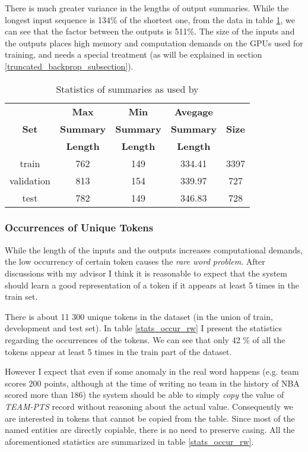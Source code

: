 There is much greater variance in the lengths of output summaries. While the longest input sequence is 134\% of the shortest one, from the data in table \ref{stats_sums_orig_rw}, we can see that the factor between the outputs is 511\%. The size of the inputs and the outputs places high memory and computation demands on the GPUs used for training, and needs a special treatment (as will be explained in section \ref{truncated_backprop_subsection}).

\begin{table}[h!]
    \centering
    \begin{tabular}{ccccc}
        \toprule
        {}    & \textbf{Max} & \textbf{Min} & \textbf{Avegage}& {} \\
        \textbf{Set} & \textbf{Summary} & \textbf{Summary} & \textbf{Summary} & \textbf{Size} \\
        {} & \textbf{Length} & \textbf{Length} & \textbf{Length} & {} \\
        \midrule
        train      & 762 & 149 & 334.41 & 3397  \\
        validation & 813 & 154 & 339.97 & 727 \\
        test       & 782 & 149 & 346.83 & 728
    \end{tabular}
    \caption{Statistics of summaries as used by \citep{wiseman2017}} \label{stats_sums_orig_rw}
\end{table}


\subsubsection{Occurrences of Unique Tokens}

While the length of the inputs and the outputs increases computational demands, the low occurrency of certain token causes the \emph{rare word problem}. After discussions with my advisor I think it is reasonable to expect that the system should learn a good representation of a token if it appears at least 5 times in the train set.

There is about 11 300 unique tokens in the dataset (in the union of train, development and test set). In table \ref{stats_occur_rw} I present the statistics regarding the occurrences of the tokens. We can see that only 42 \% of all the tokens appear at least 5 times in the train part of the dataset.

However I expect that even if some anomaly in the real word happens (e.g. team scores 200 points, although at the time of writing no team in the history of NBA scored more than 186) the system should be able to simply \emph{copy} the value of \emph{TEAM-PTS} record without reasoning about the actual value. Consequently we are interested in tokens that cannot be copied from the table. Since most of the named entities are directly copiable, there is no need to preserve casing. All the aforementioned statistics are summarized in table \ref{stats_occur_rw}.

